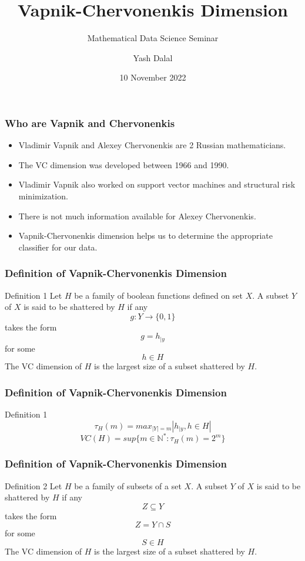 \documentclass{beamer}
\title{Vapnik-Chervonenkis Dimension}
\subtitle{Mathematical Data Science Seminar}
\author{Yash Dalal}
\institute{University of Passau}
\date{10 November 2022}
\begin{document}
\frame{\titlepage}

\begin{frame}
\frametitle{Who are Vapnik and Chervonenkis}
\begin{itemize}
    \item Vladimir Vapnik and Alexey Chervonenkis are 2 Russian mathematicians.
    \item The VC dimension was developed between 1966 and 1990.
    \item Vladimir Vapnik also worked on support vector machines and structural risk minimization.
    \item There is not much information available for Alexey Chervonenkis.
    \item Vapnik-Chervonenkis dimension helps us to determine the appropriate classifier for our data.
\end{itemize}
\end{frame}

\begin{frame}
\frametitle{Definition of Vapnik-Chervonenkis Dimension}
\begin{alertblock}{Definition 1}
Let $H$ be a family of boolean functions defined on set $X$.
A subset $Y$ of $X$ is said to be shattered by $H$ if any \[g:Y\rightarrow\{0,1\}\]takes the form \[g = h_{\mid y}\] for some \[h\in H\] The VC dimension of $H$ is the largest size of a subset shattered by $H$.
\end{alertblock}
\end{frame}

\begin{frame}
\frametitle{Definition of Vapnik-Chervonenkis Dimension}
\begin{alertblock}{Definition 1}
\[\tau_H(m) = max_{|Y|=m}|h_{\mid y},h \in H|\]
\[VC(H) = sup\{m\in \mathbb{N^*} :\tau_H(m)=2^m\}\]
\end{alertblock}

\end{frame}

\begin{frame}
\frametitle{Definition of Vapnik-Chervonenkis Dimension}
\begin{alertblock}{Definition 2}
Let $H$ be a family of subsets of a set $X$. 
A subset $Y$ of $X$ is said to be shattered by $H$ if any \[Z\subseteq Y\] takes the form \[Z=Y\cap S\] for some \[S \in H\] The VC dimension of $H$ is the largest size of a subset shattered by $H$.
\end{alertblock}

\end{frame}
\end{document}
